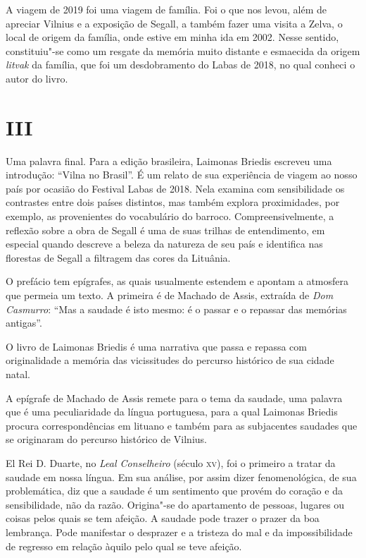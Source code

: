 A viagem de 2019 foi uma viagem de família. Foi o que nos levou, além de
apreciar Vilnius e a exposição de Segall, a também fazer uma visita a
Zelva, o local de origem da família, onde estive em minha ida em 2002.
Nesse sentido, constituiu"-se como um resgate da memória muito distante e
esmaecida da origem \emph{litvak} da família, que foi um desdobramento
do Labas de 2018, no qual conheci o autor do livro.

\section{III}

Uma palavra final. Para a edição brasileira, Laimonas Briedis escreveu
uma introdução: ``Vilna no Brasil''. É um relato de sua experiência de
viagem ao nosso país por ocasião do Festival Labas de 2018. Nela examina
com sensibilidade os contrastes entre dois países distintos, mas também
explora proximidades, por exemplo, as provenientes do vocabulário do
barroco. Compreensivelmente, a reflexão sobre a obra de Segall é uma de
suas trilhas de entendimento, em especial quando descreve a beleza da
natureza de seu país e identifica nas florestas de Segall a filtragem
das cores da Lituânia.

O prefácio tem epígrafes, as quais usualmente estendem e apontam a
atmosfera que permeia um texto. A primeira é de Machado de Assis,
extraída de \emph{Dom Casmurro}: ``Mas a saudade é isto mesmo: é o
passar e o repassar das memórias antigas''.

O livro de Laimonas Briedis é uma narrativa que passa e repassa com
originalidade a memória das vicissitudes do percurso histórico de sua
cidade natal.

A epígrafe de Machado de Assis remete para o tema da saudade, uma
palavra que é uma peculiaridade da língua portuguesa, para a qual
Laimonas Briedis procura correspondências em lituano e também para as
subjacentes saudades que se originaram do percurso histórico de Vilnius.

El Rei D. Duarte, no \emph{Leal Conselheiro} (século \textsc{xv}), foi o primeiro
a tratar da saudade em nossa língua. Em sua análise, por assim dizer
fenomenológica, de sua problemática, diz que a saudade é um sentimento
que provém do coração e da sensibilidade, não da razão. Origina"-se do
apartamento de pessoas, lugares ou coisas pelos quais se tem afeição. A
saudade pode trazer o prazer da boa lembrança. Pode manifestar o
desprazer e a tristeza do mal e da impossibilidade de regresso em
relação àquilo pelo qual se teve afeição.

